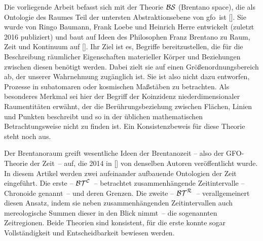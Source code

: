    Die
    vorliegende Arbeit befasst sich mit der Theorie $\mathcal{BS}$ (Brentano space), die als Ontologie des Raumes Teil der untersten Abstraktionsebene von \ac{gfo}\ ist [\cite{baumann-r-2016-53-a}].
    Sie wurde von Ringo Baumann, Frank Loebe und Heinrich Herre entwickelt (zuletzt 2016 publiziert) und baut auf Ideen des Philosophen Franz Brentano zu Raum, Zeit und Kontinuum auf [\cite{brentano-f-1976--a}].
    Ihr Ziel ist es, Begriffe bereitzustellen, die für die Beschreibung räumlicher Eigenschaften materieller Körper und Beziehungen zwischen diesen benötigt werden.
    Dabei zielt sie auf einen Größenordnungsbereich ab, der unserer Wahrnehmung zugänglich ist.
    Sie ist also nicht dazu entworfen, Prozesse in subatomaren oder kosmischen Maßstäben zu betrachten.
    Als besonderes Merkmal sei hier der Begriff der Koinzidenz niederdimensionaler Raumentitäten erwähnt, der die Berührungsbeziehung zwischen Flächen, Linien und Punkten beschreibt und so in der üblichen mathematischen Betrachtungsweise nicht zu finden ist.
    Ein Konsistenzbeweis für diese Theorie steht noch aus.
    
    Der
    Brentanoraum greift wesentliche Ideen der Brentanozeit -- also der GFO-Theorie der Zeit~-- auf, die 2014 in [\cite{baumann-r-2014-171-a}] von denselben Autoren veröffentlicht wurde.
    In diesem Artikel werden zwei aufeinander aufbauende Ontologien der Zeit eingeführt.
    Die erste -- $\mathcal{BT}^{\mathcal{C}}$~-- betrachtet zusammenhängende Zeitintervalle -- Chronoide genannt~-- und deren Grenzen. 
    Die zweite -- $\mathcal{BT}^{\mathcal{R}}$~-- verallgemeinert diesen Ansatz, indem sie neben zusammenhängenden Zeitintervallen auch mereologische Summen dieser in den Blick nimmt~-- die sogenannten Zeitregionen.
    Beide Theorien sind konsistent, für die erste konnte sogar Vollständigkeit und Entscheidbarkeit bewiesen werden.
    


